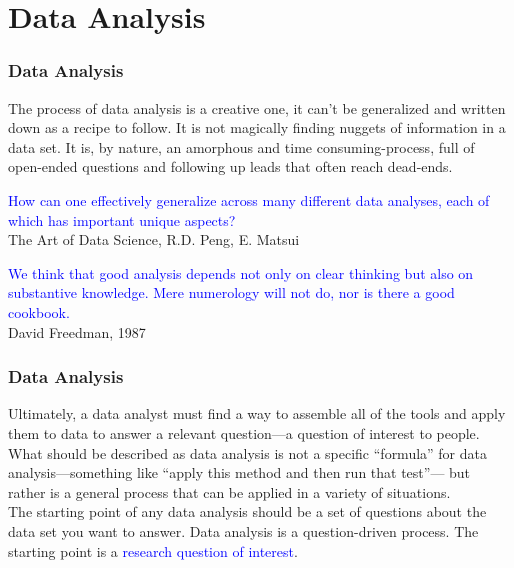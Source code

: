 \documentclass{beamer}
\begin{document}
\section{Data Analysis}
\begin{frame}
\frametitle{Data Analysis}
The process of data analysis is a creative one, it can't be generalized and written down as a recipe to follow. It is not magically finding nuggets of information in a data set. It is, by nature, an amorphous and time consuming-process, full of open-ended questions and following up leads that often reach dead-ends. \\[20pt] 
\begin{displayquote}
\textcolor{blue}{How can one effectively generalize across many different data analyses, each of which has important unique aspects?} \\[3pt]
The Art of Data Science, R.D. Peng, E. Matsui
\end{displayquote} 
\vspace*{.5cm}
\begin{displayquote}
\textcolor{blue}{We think that good analysis depends not only on clear thinking but also on substantive knowledge. Mere numerology will not do, nor is there a good cookbook.} \\[3pt]
David Freedman, 1987
\end{displayquote} 
\end{frame}
\begin{frame}
\frametitle{Data Analysis}
Ultimately, a data analyst must find a way to assemble all of the tools and apply them to data to answer a relevant question—a question of interest to people. \\[10pt]

What should be described as data analysis is not a specific “formula” for data analysis—something like “apply this method and then run that test”— but rather is a general process that can be applied in a variety of situations. \\[10pt]

The starting point of any data analysis should be a set of questions about the data set
you want to answer. Data analysis is a question-driven process. The starting point is a 
\textcolor{blue}{research question of interest}. 

\end{frame}
\end{document}
